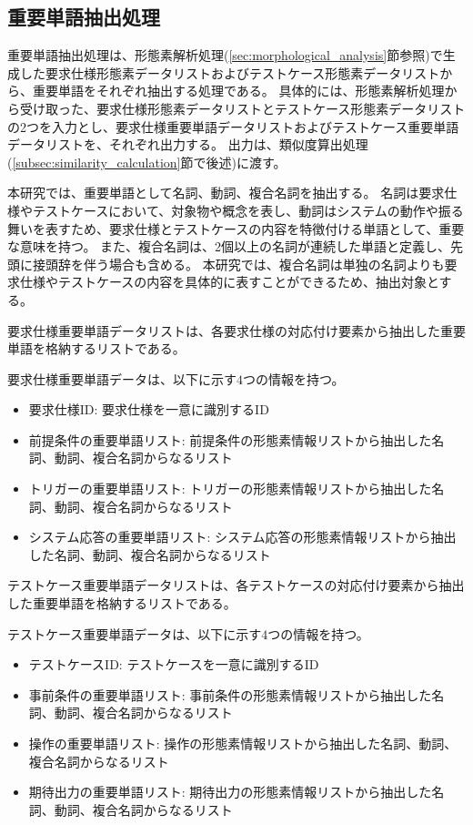 \subsection{重要単語抽出処理}\label{sec:imp_word}
重要単語抽出処理は、形態素解析処理(\cref{sec:morphological_analysis}節参照)で生成した要求仕様形態素データリストおよびテストケース形態素データリストから、重要単語をそれぞれ抽出する処理である。
具体的には、形態素解析処理から受け取った、要求仕様形態素データリストとテストケース形態素データリストの2つを入力とし、要求仕様重要単語データリストおよびテストケース重要単語データリストを、それぞれ出力する。
出力は、類似度算出処理(\ref{subsec:similarity_calculation}節で後述)に渡す。

本研究では、重要単語として名詞、動詞、複合名詞を抽出する。
名詞は要求仕様やテストケースにおいて、対象物や概念を表し、動詞はシステムの動作や振る舞いを表すため、要求仕様とテストケースの内容を特徴付ける単語として、重要な意味を持つ。
また、複合名詞は、2個以上の名詞が連続した単語と定義し、先頭に接頭辞を伴う場合も含める。
本研究では、複合名詞は単独の名詞よりも要求仕様やテストケースの内容を具体的に表すことができるため、抽出対象とする。

要求仕様重要単語データリストは、各要求仕様の対応付け要素から抽出した重要単語を格納するリストである。

要求仕様重要単語データは、以下に示す$4$つの情報を持つ。
\begin{itemize}
    \item 要求仕様ID: 要求仕様を一意に識別するID
    \item 前提条件の重要単語リスト: 前提条件の形態素情報リストから抽出した名詞、動詞、複合名詞からなるリスト
    \item トリガーの重要単語リスト: トリガーの形態素情報リストから抽出した名詞、動詞、複合名詞からなるリスト
    \item システム応答の重要単語リスト: システム応答の形態素情報リストから抽出した名詞、動詞、複合名詞からなるリスト
\end{itemize}

テストケース重要単語データリストは、各テストケースの対応付け要素から抽出した重要単語を格納するリストである。

テストケース重要単語データは、以下に示す$4$つの情報を持つ。
\begin{itemize}
    \item テストケースID: テストケースを一意に識別するID
    \item 事前条件の重要単語リスト: 事前条件の形態素情報リストから抽出した名詞、動詞、複合名詞からなるリスト
    \item 操作の重要単語リスト: 操作の形態素情報リストから抽出した名詞、動詞、複合名詞からなるリスト
    \item 期待出力の重要単語リスト: 期待出力の形態素情報リストから抽出した名詞、動詞、複合名詞からなるリスト
\end{itemize}

